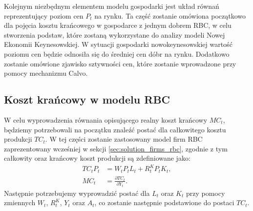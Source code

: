 Kolejnym niezbędnym elementem modelu gospodarki jest układ równań reprezentujący poziom cen $P_t$ na rynku. Ta część zostanie omówiona początkowo dla pojęcia kosztu krańcowego w gospodarce z jednym dobrem RBC, w celu stworzenia podstaw, które zostaną wykorzystane do analizy modeli Nowej Ekonomii Keynesowskiej. W sytuacji gospodarki nowokeynesowskiej wartość poziomu cen będzie odnosiła się do średniej cen dóbr na rynku. Dodatkowo zostanie omówione zjawisko sztywności cen, które zostanie wprowadzone przy pomocy mechanizmu Calvo.

\subsection{Koszt krańcowy w modelu RBC}
\label{sec:rbc_price_level}

W celu wyprowadzenia równania opisującego realny koszt krańcowy $MC_t$, będziemy potrzebowali na początku znaleźć postać dla całkowitego kosztu produkcji $TC_t$. W tej części zostanie zastosowany model firm RBC zaprezentowany wcześniej w sekcji \ref{sec:solution_firms_rbc}, zgodnie z tym całkowity oraz krańcowy koszt produkcji są zdefiniowane jako:
\begin{align}
    TC_t P_t &= W_t P_t L_t + R^K_t P_t K_t, \label{priceLevel:tc}\\
    MC_t &= \frac{\partial TC_t}{\partial Y_t}. \label{priceLevel:mc}
\end{align}
Następnie potrzebujemy wyprowadzić postać dla $L_t$ oraz $K_t$ przy pomocy zmiennych $W_t$, $R^K_t$, $Y_t$ oraz $A_t$, co zostanie następnie podstawione do postaci $TC_t$. 

